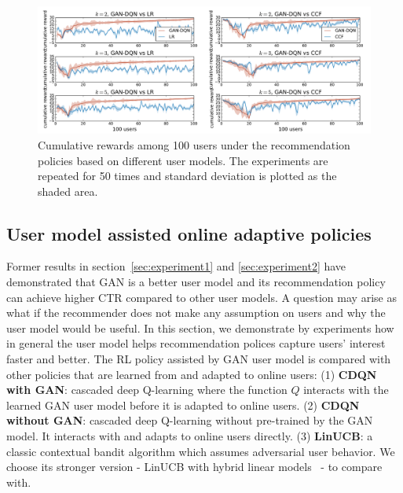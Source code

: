 \documentclass{article} %
\begin{document}
\begin{figure}[ht!]
\vspace{-1mm}
\centering
\includegraphics[width=\textwidth]{policy_compare1}	
\vspace{-5mm}
\caption{\small Cumulative rewards among 100 users under the recommendation policies based on different user models. The experiments are repeated for 50 times and standard deviation is plotted as the shaded area.}
\label{fg:policy_compare_rwd}
\vspace{-3mm}
\end{figure}

\vspace{-3mm}
\subsection{User model assisted online adaptive policies}\label{sec:experiment3}
\vspace{-3mm}

Former results in section~\ref{sec:experiment1} and \ref{sec:experiment2} have demonstrated that GAN is a better user model and its recommendation policy can achieve higher CTR compared to other user models. A question may arise as what if the recommender does not make any assumption on users and why the user model would be useful. In this section, we demonstrate by experiments how in general the user model helps recommendation polices capture users' interest faster and better. The RL policy assisted by GAN user model is compared with other policies that are learned from and adapted to online users: (1) {\bf CDQN with GAN}: cascaded deep Q-learning where the function $Q$ interacts with the learned GAN user model before it is adapted to online users. (2) {\bf CDQN without GAN}: cascaded deep Q-learning without pre-trained by the GAN model. It interacts with and adapts to online users directly. (3) {\bf LinUCB}: a classic contextual bandit algorithm which assumes adversarial user behavior. We choose its stronger version - LinUCB with hybrid linear models~\citep{LiChuLanSch10} - to compare with.
\end{document}
